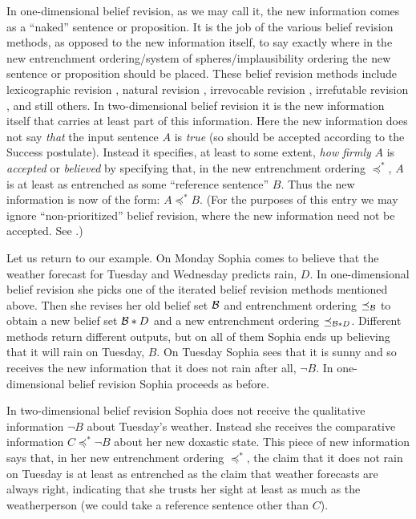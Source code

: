 In one-dimensional belief revision, as we may call it, the new information comes as a ``naked'' \citep{r07} sentence or proposition. It is the job of the various belief revision methods, as opposed to the new information itself, to say exactly where in the new entrenchment ordering/system of spheres/implausibility ordering the new sentence or proposition should be placed. These belief revision methods include lexicographic revision \citep{n94}, natural revision \citep{b96}, irrevocable revision \citep{s98, f00}, irrefutable revision \citep{r06}, and still others. In two-dimensional belief revision it is the new information itself that carries at least part of this information. Here the new information does not say \emph{that} the input sentence $A$ is \emph{true} (so should be accepted according to the Success postulate). Instead it specifies, at least to some extent, \emph{how firmly} $A$ is \emph{accepted} or \emph{believed} by specifying that, in the new entrenchment ordering $\preceq^*$, $A$ is at least as entrenched as some ``reference sentence'' $B$. Thus the new information is now of the form: $A\preceq^* B$. (For the purposes of this entry we may ignore ``non-prioritized'' belief revision, where the new information need not be accepted. See \citealp{hfcf01}.)

Let us return to our example. On Monday Sophia comes to believe that the weather forecast for Tuesday and Wednesday predicts rain, $D$. In one-dimensional belief revision she picks one of the iterated belief revision methods mentioned above. Then she revises her old belief set $\cal B$ and entrenchment ordering $\preceq_{\cal B}$ to obtain a new belief set $\begin{cal}B\end{cal}*D$ and a new entrenchment ordering $\preceq_{\begin{cal}B\end{cal}*D}$. Different methods return different outputs, but on all of them Sophia ends up believing that it will rain on Tuesday, $B$. On Tuesday Sophia sees that it is sunny and so receives the new information that it does not rain after all, $\neg B$. In one-dimensional belief revision Sophia proceeds as before.

In two-dimensional belief revision Sophia does not receive the qualitative information $\neg B$ about Tuesday's weather. Instead she receives the comparative information $C\preceq^*\neg B$ about her new doxastic state. This piece of new information says that, in her new entrenchment ordering $\preceq^*$, the claim that it does not rain on Tuesday is at least as entrenched as the claim that weather forecasts are always right, indicating that she trusts her sight at least as much as the weatherperson (we could take a reference sentence other than $C$).

